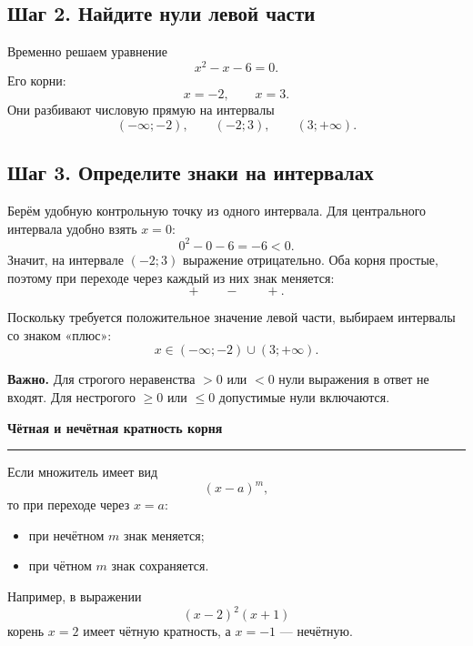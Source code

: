 \documentclass[a4paper,12pt]{article}
\newcommand{\keyidea}[1]{%
  \par\medskip
  {\bfseries\color{darkaccent}#1}\par
  \vspace{1pt}
  {\color{accent}\rule{\linewidth}{0.55pt}}\par
  \vspace{2pt}
}
\newcommand{\important}[1]{%
  \par\smallskip
  \noindent\textbf{\color{darkaccent}Важно.} #1\par
}
\begin{document}
\subsection{Шаг 2. Найдите нули левой части}
Временно решаем уравнение
\[
x^2-x-6=0.
\]
Его корни:
\[
x=-2,
\qquad
x=3.
\]
Они разбивают числовую прямую на интервалы
\[
(-\infty;-2),
\qquad
(-2;3),
\qquad
(3;+\infty).
\]

\subsection{Шаг 3. Определите знаки на интервалах}
Берём удобную контрольную точку из одного интервала. Для центрального интервала удобно взять \(x=0\):
\[
0^2-0-6=-6<0.
\]
Значит, на интервале \((-2;3)\) выражение отрицательно. Оба корня простые, поэтому при переходе через каждый из них знак меняется:
\[
+\qquad -\qquad +.
\]

\begin{center}
\end{center}

Поскольку требуется положительное значение левой части, выбираем интервалы со знаком «плюс»:
\[
x\in(-\infty;-2)\cup(3;+\infty).
\]

\important{Для строгого неравенства \(>0\) или \(<0\) нули выражения в ответ не входят. Для нестрогого \(\ge0\) или \(\le0\) допустимые нули включаются.}

\keyidea{Чётная и нечётная кратность корня}
Если множитель имеет вид
\[
(x-a)^m,
\]
то при переходе через \(x=a\):
\begin{itemize}[leftmargin=8mm,itemsep=1mm,topsep=2mm]
  \item при нечётном \(m\) знак меняется;
  \item при чётном \(m\) знак сохраняется.
\end{itemize}

Например, в выражении
\[
(x-2)^2(x+1)
\]
корень \(x=2\) имеет чётную кратность, а \(x=-1\) --- нечётную.
\end{document}
